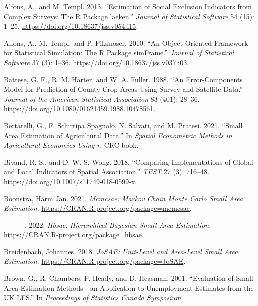 \hypertarget{refs}{}
\begin{CSLReferences}{1}{0}
\leavevmode{}%
Alfons, A., and M. Templ. 2013. {``Estimation of Social Exclusion Indicators from Complex Surveys: The {R} Package {laeken}.''} \emph{Journal of Statistical Software} 54 (15): 1--25. \url{https://doi.org/10.18637/jss.v054.i15}.

\leavevmode{}%
Alfons, A., M. Templ, and P. Filzmoser. 2010. {``An Object-Oriented Framework for Statistical Simulation: The {R} Package {simFrame}.''} \emph{Journal of Statistical Software} 37 (3): 1--36. \url{https://doi.org/10.18637/jss.v037.i03}.

\leavevmode{}%
Battese, G. E., R. M. Harter, and W. A. Fuller. 1988. {``An Error-Components Model for Prediction of County Crop Areas Using Survey and Satellite Data.''} \emph{Journal of the American Statistical Association} 83 (401): 28--36. \url{https://doi.org/10.1080/01621459.1988.10478561}.

\leavevmode{}%
Bertarelli, G., F. Schirripa Spagnolo, N. Salvati, and M. Pratesi. 2021. {``Small Area Estimation of Agricultural Data.''} In \emph{Spatial Econometric Methods in Agricultural Economics Using r}. CRC book.

\leavevmode{}%
Bivand, R. S., and D. W. S. Wong. 2018. {``Comparing Implementations of Global and Local Indicators of Spatial Association.''} \emph{TEST} 27 (3): 716--48. \url{https://doi.org/10.1007/s11749-018-0599-x}.

\leavevmode{}%
Boonstra, Harm Jan. 2021. \emph{Mcmcsae: Markov Chain Monte Carlo Small Area Estimation}. \url{https://CRAN.R-project.org/package=mcmcsae}.

\leavevmode{}%
---------. 2022. \emph{Hbsae: Hierarchical Bayesian Small Area Estimation}. \url{https://CRAN.R-project.org/package=hbsae}.

\leavevmode{}%
Breidenbach, Johannes. 2018. \emph{JoSAE: Unit-Level and Area-Level Small Area Estimation}. \url{https://CRAN.R-project.org/package=JoSAE}.

\leavevmode{}%
Brown, G., R. Chambers, P. Heady, and D. Heasman. 2001. {``Evaluation of Small Area Estimation Methods - an Application to Unemployment Estimates from the {UK} {LFS}.''} In \emph{Proceedings of Statistics Canada Symposium}.


\end{CSLReferences}

